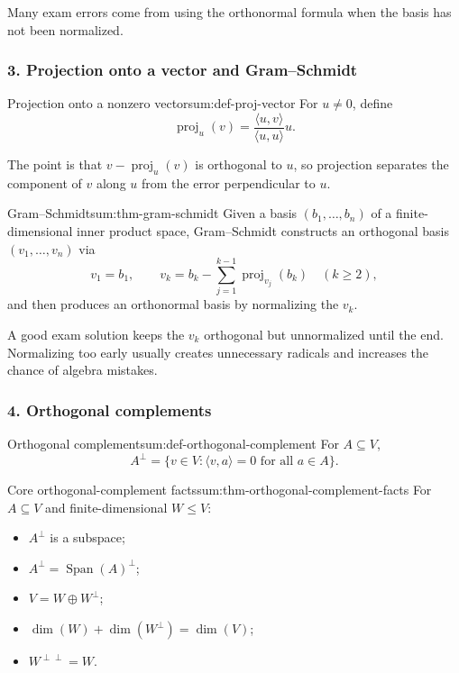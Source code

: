 \begin{commonmistake}[title={Common Mistake: orthogonal \(\neq\) orthonormal}]
Many exam errors come from using the orthonormal formula when the basis has not been normalized.
\end{commonmistake}

\subsubsection*{3. Projection onto a vector and Gram--Schmidt}

\begin{definition}{Projection onto a nonzero vector}{sum:def-proj-vector}
For \(u\neq 0\), define
\[
\operatorname{proj}_u(v)=\frac{\langle u,v\rangle}{\langle u,u\rangle}u.
\]
\end{definition}

The point is that \(v-\operatorname{proj}_u(v)\) is orthogonal to \(u\), so projection separates the component of \(v\) along \(u\) from the error perpendicular to \(u\).

\begin{theorem}{Gram--Schmidt}{sum:thm-gram-schmidt}
Given a basis \((b_1,\dots,b_n)\) of a finite-dimensional inner product space, Gram--Schmidt constructs an orthogonal basis \((v_1,\dots,v_n)\) via
\[
v_1=b_1,\qquad
v_k=b_k-\sum_{j=1}^{k-1}\operatorname{proj}_{v_j}(b_k)\quad (k\ge 2),
\]
and then produces an orthonormal basis by normalizing the \(v_k\).
\end{theorem}

\begin{examtip}[title={Exam Focus: efficient Gram--Schmidt}]
A good exam solution keeps the \(v_k\) orthogonal but unnormalized until the end. Normalizing too early usually creates unnecessary radicals and increases the chance of algebra mistakes.
\end{examtip}

\subsubsection*{4. Orthogonal complements}

\begin{definition}{Orthogonal complement}{sum:def-orthogonal-complement}
For \(A\subseteq V\),
\[
A^\perp = \{v\in V : \langle v,a\rangle=0 \text{ for all } a\in A\}.
\]
\end{definition}

\begin{theorem}{Core orthogonal-complement facts}{sum:thm-orthogonal-complement-facts}
For \(A\subseteq V\) and finite-dimensional \(W\le V\):
\begin{itemize}[leftmargin=*]
    \item \(A^\perp\) is a subspace;
    \item \(A^\perp=\operatorname{Span}(A)^\perp\);
    \item \(V=W\oplus W^\perp\);
    \item \(\dim(W)+\dim(W^\perp)=\dim(V)\);
    \item \(W^{\perp\perp}=W\).
\end{itemize}
\end{theorem}


